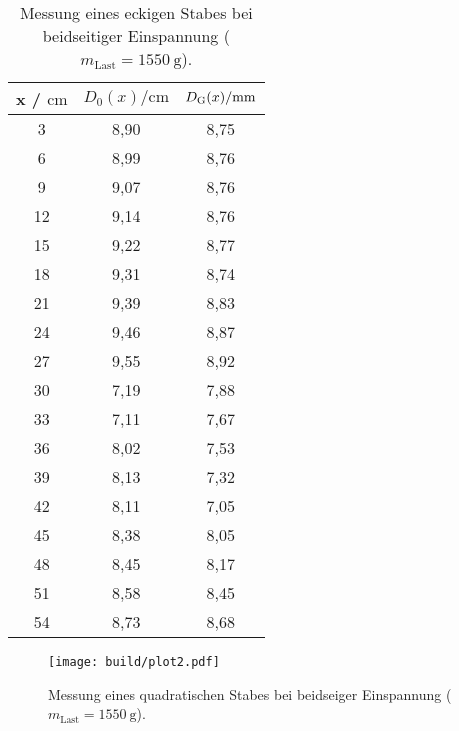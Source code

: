 \sloppy
\begin{table}[H]
  \centering
  \caption{Messung eines eckigen Stabes bei beidseitiger Einspannung ($m_{\text{Last}} = \SI{1550}{\gram}$).}
  \label{tab:werte3}
  \begin{tabular}{c c c}
    \toprule
    x / $\si{\centi\meter} $ & $ D_0(x) / \si{\centi\meter}$ & $D_{\text G}(x) / \si{\milli\meter}$ \\
    \midrule
    3 & 8,90 & 8,75 \\
    6 & 8,99 & 8,76 \\
    9 & 9,07 & 8,76 \\
    12 & 9,14 & 8,76 \\
    15 & 9,22 & 8,77 \\
    18 & 9,31 & 8,74 \\
    21 & 9,39 & 8,83 \\
    24 & 9,46 & 8,87 \\
    27 & 9,55 & 8,92 \\
    30 & 7,19 & 7,88 \\
    33 & 7,11 & 7,67 \\
    36 & 8,02 & 7,53 \\
    39 & 8,13 & 7,32 \\
    42 & 8,11 & 7,05 \\
    45 & 8,38 & 8,05 \\
    48 & 8,45 & 8,17 \\
    51 & 8,58 & 8,45 \\
    54 & 8,73 & 8,68 \\
    \bottomrule
  \end{tabular}
\end{table}

\sloppy
\begin{figure}[H]
  \centering
  \texttt{[image: build/plot2.pdf]}
  \caption{Messung eines quadratischen Stabes bei beidseiger Einspannung ($m_{\text{Last}} = \SI{1550}{\gram}$).}
  \label{fig:plot2}
\end{figure}


